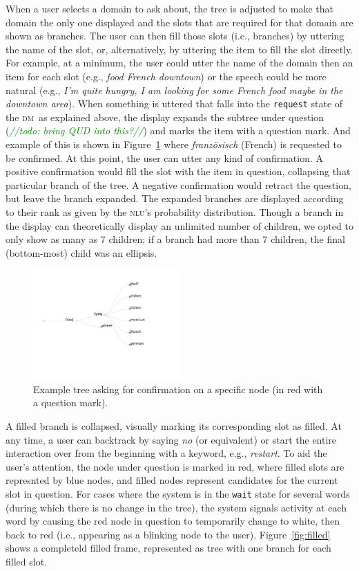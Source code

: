 \documentclass[11pt]{article}
\newcommand{\todo}[1]{\textcolor{green}{\emph{//todo: #1//}}}
\newcommand{\nlu}[0]{\textsc{nlu}}
\newcommand{\dm}[0]{\textsc{dm}}
\begin{document}
When a user selects a domain to ask about, the tree is adjusted to make that domain the only one displayed and the slots that are required for that domain are shown as branches. The user can then fill those slots (i.e., branches) by uttering the name of the slot, or, alternatively, by uttering the item to fill the slot directly. For example, at a minimum, the user could utter the name of the domain then an item for each slot (e.g.,  \emph{food French downtown}) or the speech could be more natural (e.g., \emph{I'm quite hungry, I am looking for some French food maybe in the downtown area}). When something is uttered that falls into the \texttt{request} state of the \dm\ as explained above, the display expands the subtree under question (\todo{bring QUD into this?}) and marks the item with a question mark. And example of this is shown in Figure~\ref{fig:confirm} where \emph{französisch} (French) is requested to be confirmed. At this point, the user can utter any kind of confirmation. A positive confirmation would fill the slot with the item in question, collapsing that particular branch of the tree. A negative confirmation would retract the question, but leave the branch expanded. The expanded branches are displayed according to their rank as given by the \nlu's probability distribution. Though a branch in the display can theoretically display an unlimited number of children, we opted to only show as many as 7 children; if a branch had more than 7 children, the final (bottom-most) child was an ellipsis. 

\begin{figure}[ht]
  \centering
      \includegraphics[width=0.5\textwidth]{figures/diatree-confirmation.pdf}	
      \caption{Example tree asking for confirmation on a specific node (in red with a question mark).\label{fig:confirm}}
\end{figure}

A filled  branch is collapsed, visually marking its corresponding slot as filled. At any time, a user can backtrack by saying \emph{no} (or equivalent) or start the entire interaction over from the beginning with a keyword, e.g., \emph{restart}. To aid the user's attention, the node under question is marked in red, where filled slots are represnted by blue nodes, and filled nodes represent candidates for the current slot in question. For cases where the system is in the \texttt{wait} state for several words (during which there is no change in the tree), the system signals activity at each word by causing the red node in question to temporarily change to white, then back to red (i.e., appearing as a blinking node to the user). Figure~\ref{fig:filled} shows a completeld filled frame, represented as tree with one branch for each filled slot.
\end{document}
